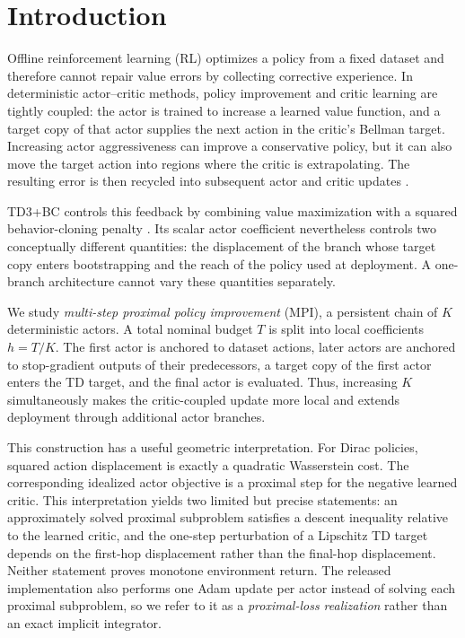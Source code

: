 \section{Introduction}
\label{sec:introduction}

Offline reinforcement learning (RL) optimizes a policy from a fixed dataset and therefore cannot repair value errors by collecting corrective experience. In deterministic actor--critic methods, policy improvement and critic learning are tightly coupled: the actor is trained to increase a learned value function, and a target copy of that actor supplies the next action in the critic's Bellman target. Increasing actor aggressiveness can improve a conservative policy, but it can also move the target action into regions where the critic is extrapolating. The resulting error is then recycled into subsequent actor and critic updates \citep{fujimoto2019offpolicy,kumar2019bear,kumar2020cql}.

TD3+BC controls this feedback by combining value maximization with a squared behavior-cloning penalty \citep{fujimoto2021minimalist}. Its scalar actor coefficient nevertheless controls two conceptually different quantities: the displacement of the branch whose target copy enters bootstrapping and the reach of the policy used at deployment. A one-branch architecture cannot vary these quantities separately.

We study \emph{multi-step proximal policy improvement} (MPI), a persistent chain of $K$ deterministic actors. A total nominal budget $T$ is split into local coefficients $h=T/K$. The first actor is anchored to dataset actions, later actors are anchored to stop-gradient outputs of their predecessors, a target copy of the first actor enters the TD target, and the final actor is evaluated. Thus, increasing $K$ simultaneously makes the critic-coupled update more local and extends deployment through additional actor branches.

This construction has a useful geometric interpretation. For Dirac policies, squared action displacement is exactly a quadratic Wasserstein cost. The corresponding idealized actor objective is a proximal step for the negative learned critic. This interpretation yields two limited but precise statements: an approximately solved proximal subproblem satisfies a descent inequality relative to the learned critic, and the one-step perturbation of a Lipschitz TD target depends on the first-hop displacement rather than the final-hop displacement. Neither statement proves monotone environment return. The released implementation also performs one Adam update per actor instead of solving each proximal subproblem, so we refer to it as a \emph{proximal-loss realization} rather than an exact implicit integrator.

